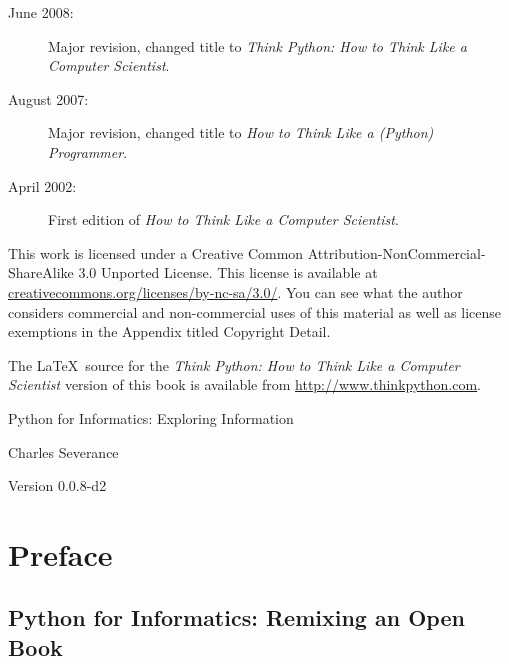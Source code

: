 \documentclass[11pt]{book}
\newcommand{\thetitle}{Python for Informatics: Exploring Information}
\newcommand{\theversion}{0.0.8-d2}
\begin{document}
\begin{latexonly}
{\begin{description}
\item[June 2008:] Major revision, changed title to
\emph{Think Python: How to Think Like
a Computer Scientist}.

\item[August 2007:] Major revision, changed title to
\emph{How to Think Like a (Python) Programmer}.

\item[April 2002:] First edition of \emph{How to Think Like
a Computer Scientist}.

\end{description}

\vspace{0.2in}

This work is licensed under a 
Creative Common
Attribution-NonCommercial-ShareAlike 3.0 Unported License.
This license is 
available at
\url{creativecommons.org/licenses/by-nc-sa/3.0/}.  You can 
see what the author considers commercial and non-commercial
uses of this material as well as license exemptions 
in the Appendix titled Copyright Detail.

The \LaTeX\ source for the 
\emph{Think Python: How to Think Like
a Computer Scientist}
version of this book is available from
\url{http://www.thinkpython.com}.

\vspace{0.2in}

} %

\end{latexonly}



\begin{htmlonly}


{\Large \thetitle}

{\large 
Charles Severance}

Version \theversion

\setcounter{chapter}{-1}

\end{htmlonly}

\chapter{Preface}

\section*{Python for Informatics: Remixing an Open Book}
\end{document}
